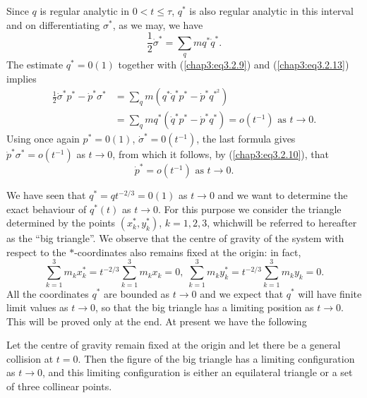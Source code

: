 Since $q$ is regular analytic in $0 < t \leq \tau$, $q^*$ is also
regular analytic in this interval and on differentiating $\sigma^*$,
as we may, we have 
\begin{equation*}
\frac{1}{2} \dot{\sigma}^* = \sum\limits_q mq^*
\dot{q}^*. \tag{3.2.13}\label{chap3:eq3.2.13} 
\end{equation*}
The estimate $q^* = 0(1)$ together with (\ref{chap3:eq3.2.9}) and
(\ref{chap3:eq3.2.13}) implies  
\begin{align*}
\frac{1}{2} \dot{\sigma}^* p^* - \dot{p}^* \sigma^* & =  \sum_q m (q^*
\dot{q}^* p^* - \dot{p}^* q^{*^2})\\ 
& =  \sum\limits_q m q^* (\dot{q}^* p^* - \dot{p}^* q^*) = o (t^{-1}) \text{ as } t \to 0. 
\end{align*}
Using once again $p^* = 0(1)$, $\dot{\sigma}^* = 0 (t^{-1})$, the last
formula gives $\dot{p}^* \sigma^* = o(t^{-1})$ as $t \to 0$, from
which it follows, by (\ref{chap3:eq3.2.10}), that $$ 
\dot{p}^* = o (t^{-1}) \text{ as } t \to 0. 
$$

We have seen that $q^* = qt^{-2/3} = 0 (1)$ as $t \to 0$ and we want
to determine the exact behaviour of $q^* (t)$ as $t \to 0$. For this
purpose we consider the triangle determined by the points $(x^*_k,
y^*_k)$, $k = 1,2,3$, which\pageoriginale will be referred to
hereafter as the ``big triangle''. We observe that the centre of
gravity of the system with respect to the $*$-coordinates also remains
fixed at the origin: in fact,  
$$
\sum\limits^3_{k=1} m_k x^*_k = t^{-2/3} \sum\limits^{3}_{k=1} m_k x_k
= 0, \; \sum\limits^3_{k=1} m_k y_k^* = t^{-2/3} \sum\limits^{3}_{k=1}
m_k y_k = 0. 
 $$
All the coordinates $q^*$ are bounded as $t \to 0$ and we expect that
$q^*$ will have finite limit values as $t \to 0$, so that the big
triangle has a limiting position as $t \to 0$. This will be proved
only at the end. At present we have the following 

\begin{subtheorem}\label{chap3:thm3.2.2}
Let the  centre of gravity remain fixed at the origin and let there be
a general collision at $t = 0$. Then the figure of the big triangle
has a limiting configuration as $t \to 0$, and this limiting
configuration is either an equilateral triangle or a set of three
collinear points. 
\end{subtheorem}

